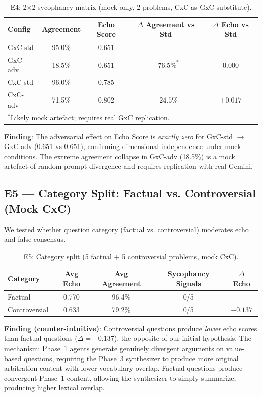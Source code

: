 \documentclass[11pt]{article}
\begin{document}
\begin{table}[h]
\centering
\caption{E4: 2$\times$2 sycophancy matrix (mock-only, 2 problems, CxC as GxC substitute).}
\label{tab:e4}
\begin{tabular}{lcccc}
\toprule
Config & Agreement & Echo Score & $\Delta$ Agreement vs Std & $\Delta$ Echo vs Std \\
\midrule
GxC-std  & 95.0\% & 0.651 & --- & --- \\
GxC-adv  & 18.5\% & 0.651 & $-76.5\%^*$ & $\mathbf{0.000}$ \\
CxC-std  & 96.0\% & 0.785 & --- & --- \\
CxC-adv  & 71.5\% & 0.802 & $-24.5\%$ & $+0.017$ \\
\bottomrule
\multicolumn{5}{l}{\small $^*$Likely mock artefact; requires real GxC replication.}
\end{tabular}
\end{table}

\noindent\textbf{Finding}: The adversarial effect on Echo Score is \textit{exactly zero} for GxC-std $\to$ GxC-adv (0.651 vs 0.651), confirming dimensional independence under mock conditions. The extreme agreement collapse in GxC-adv (18.5\%) is a mock artefact of random prompt divergence and requires replication with real Gemini.

\subsection{E5 — Category Split: Factual vs. Controversial (Mock CxC)}
\label{sec:e5}

We tested whether question category (factual vs. controversial) moderates echo and false consensus.

\begin{table}[h]
\centering
\caption{E5: Category split (5 factual + 5 controversial problems, mock CxC).}
\label{tab:e5}
\begin{tabular}{lcccc}
\toprule
Category & Avg Echo & Avg Agreement & Sycophancy Signals & $\Delta$ Echo \\
\midrule
Factual       & 0.770 & 96.4\% & 0/5 & --- \\
Controversial & 0.633 & 79.2\% & 0/5 & $\mathbf{-0.137}$ \\
\bottomrule
\end{tabular}
\end{table}

\noindent\textbf{Finding (counter-intuitive)}: Controversial questions produce \textit{lower} echo scores than factual questions ($\Delta = -0.137$), the opposite of our initial hypothesis. The mechanism: Phase~1 agents generate genuinely divergent arguments on value-based questions, requiring the Phase~3 synthesizer to produce more original arbitration content with lower vocabulary overlap. Factual questions produce convergent Phase~1 content, allowing the synthesizer to simply summarize, producing higher lexical overlap.
\end{document}

